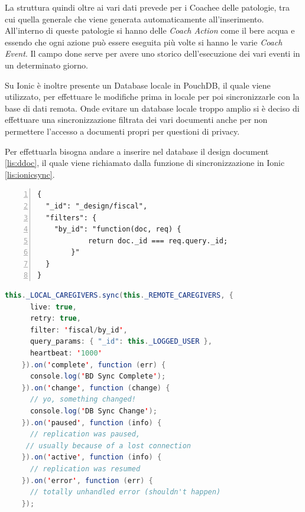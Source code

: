 \documentclass[a4paper,titlepage]{book}
\begin{document}
La struttura quindi oltre ai vari dati prevede per i Coachee delle patologie, tra cui quella generale che viene generata automaticamente all'inserimento. All'interno di queste patologie si hanno delle \textit{Coach Action} come il bere acqua e essendo che ogni azione pu\`{o} essere eseguita pi\`{u} volte si hanno le varie \textit{Coach Event}. Il campo done serve per avere uno storico dell'esecuzione dei vari eventi in un determinato giorno.

Su Ionic \`{e} inoltre presente un Database locale in PouchDB, il quale viene utilizzato, per effettuare le modifiche prima in locale per poi sincronizzarle con la base di dati remota. Onde evitare un database locale troppo amplio si \`{e} deciso di effettuare una sincronizzazione filtrata dei vari documenti anche per non permettere l'accesso a documenti propri per questioni di privacy. 

Per effettuarla bisogna andare a inserire nel database il design document \ref{lis:ddoc}, il quale viene richiamato dalla funzione di sincronizzazione in Ionic \ref{lis:ionicsync}.

\pagebreak
\begin{lstlisting}[showspaces=false,
           basicstyle=\ttfamily,
           numbers=left,
           numberstyle=\tiny,
           commentstyle=\color{gray},
	  captionpos=b,
	  caption=Design document,
	  label=lis:ddoc]
{
  "_id": "_design/fiscal",
  "filters": {
    "by_id": "function(doc, req) { 
			return doc._id === req.query._id; 
		}"
  }
}

\end{lstlisting}

\begin{lstlisting}[language=Java,
	  captionpos=b,
	  caption=Funzione di sincronizzazione,
	  label=lis:ionicsync]
this._LOCAL_CAREGIVERS.sync(this._REMOTE_CAREGIVERS, {
      live: true,
      retry: true,
      filter: 'fiscal/by_id',
      query_params: { "_id": this._LOGGED_USER },
      heartbeat: '1000'
    }).on('complete', function (err) {
      console.log('BD Sync Complete');
    }).on('change', function (change) {
      // yo, something changed!
      console.log('DB Sync Change');
    }).on('paused', function (info) {
      // replication was paused, 
     // usually because of a lost connection
    }).on('active', function (info) {
      // replication was resumed
    }).on('error', function (err) {
      // totally unhandled error (shouldn't happen)
    });
\end{lstlisting}
\end{document}
